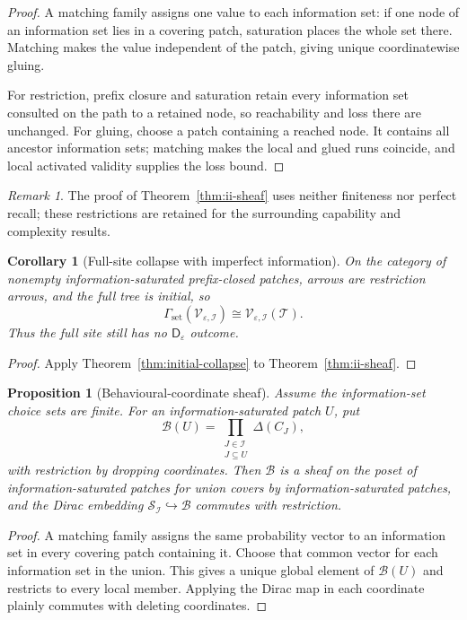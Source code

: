 \documentclass[11pt]{article}
\theoremstyle{plain}
\newtheorem{proposition}[theorem]{Proposition}
\newtheorem{corollary}[theorem]{Corollary}
\theoremstyle{definition}
\theoremstyle{remark}
\newtheorem{remark}[theorem]{Remark}
\newcommand{\eps}{\varepsilon}
\begin{document}
\begin{proof}
A matching family assigns one value to each information set: if one node of an
information set lies in a covering patch, saturation places the whole set there.
Matching makes the value independent of the patch, giving unique coordinatewise
gluing.

For restriction, prefix closure and saturation retain every information set
consulted on the path to a retained node, so reachability and loss there are
unchanged. For gluing, choose a patch containing a reached node. It contains all
ancestor information sets; matching makes the local and glued runs coincide, and
local activated validity supplies the loss bound.
\end{proof}

\begin{remark}
The proof of Theorem~\ref{thm:ii-sheaf} uses neither finiteness nor perfect
recall; these restrictions are retained for the surrounding capability and
complexity results.
\end{remark}


\begin{corollary}[Full-site collapse with imperfect information]
\label{cor:ii-collapse}
On the category of nonempty information-saturated prefix-closed patches, arrows
are restriction arrows, and the full tree is initial, so
\[
\Gamma_{\mathrm{set}}(\mathscr V_{\eps,\mathcal I})
\cong\mathscr V_{\eps,\mathcal I}(\mathcal T).
\]
Thus the full site still has no $\mathsf D_\eps$ outcome.
\end{corollary}

\begin{proof}
Apply Theorem~\ref{thm:initial-collapse} to
Theorem~\ref{thm:ii-sheaf}.
\end{proof}

\begin{proposition}[Behavioural-coordinate sheaf]
\label{prop:behavioural-sheaf}
Assume the information-set choice sets are finite. For an
information-saturated patch $U$, put
\[
\mathscr B(U)=
\prod_{\substack{J\in\mathcal I\\J\subseteq U}}\Delta(C_J),
\]
with restriction by dropping coordinates. Then $\mathscr B$ is a sheaf on the poset of information-saturated patches
for union covers by information-saturated patches, and the Dirac embedding
$\mathscr S_{\mathcal I}\hookrightarrow\mathscr B$ commutes with restriction.
\end{proposition}

\begin{proof}
A matching family assigns the same probability vector to an information set in
every covering patch containing it. Choose that common vector for each
information set in the union. This gives a unique global element of
$\mathscr B(U)$ and restricts to every local member. Applying the Dirac map in
each coordinate plainly commutes with deleting coordinates.
\end{proof}
\end{document}
